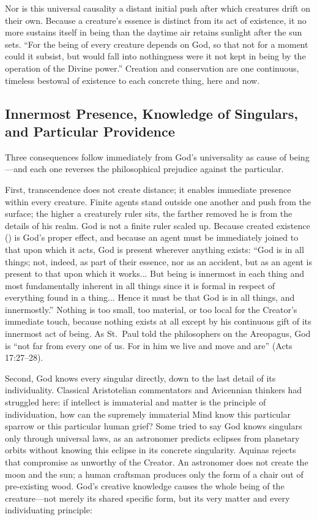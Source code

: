 Nor is this universal causality a distant initial push after which creatures drift on their own. Because a creature's essence is distinct from its act of existence, it no more sustains itself in being than the daytime air retains sunlight after the sun sets. ``For the being of every creature depends on God, so that not for a moment could it subsist, but would fall into nothingness were it not kept in being by the operation of the Divine power.'' Creation and conservation are one continuous, timeless bestowal of existence to each concrete thing, here and now.

\subsection{Innermost Presence, Knowledge of Singulars, and Particular Providence}

Three consequences follow immediately from God's universality as cause of being---and each one reverses the philosophical prejudice against the particular.

First, transcendence does not create distance; it enables immediate presence within every creature. Finite agents stand outside one another and push from the surface; the higher a creaturely ruler sits, the farther removed he is from the details of his realm. God is not a finite ruler scaled up. Because created existence () is God's proper effect, and because an agent must be immediately joined to that upon which it acts, God is present wherever anything exists: ``God is in all things; not, indeed, as part of their essence, nor as an accident, but as an agent is present to that upon which it works... But being is innermost in each thing and most fundamentally inherent in all things since it is formal in respect of everything found in a thing... Hence it must be that God is in all things, and innermostly.'' Nothing is too small, too material, or too local for the Creator's immediate touch, because nothing exists at all except by his continuous gift of its innermost act of being. As St.\ Paul told the philosophers on the Areopagus, God is ``not far from every one of us. For in him we live and move and are'' (Acts 17:27--28).

Second, God knows every singular directly, down to the last detail of its individuality. Classical Aristotelian commentators and Avicennian thinkers had struggled here: if intellect is immaterial and matter is the principle of individuation, how can the supremely immaterial Mind know this particular sparrow or this particular human grief? Some tried to say God knows singulars only through universal laws, as an astronomer predicts eclipses from planetary orbits without knowing this eclipse in its concrete singularity. Aquinas rejects that compromise as unworthy of the Creator. An astronomer does not create the moon and the sun; a human craftsman produces only the form of a chair out of pre-existing wood. God's creative knowledge causes the whole being of the creature---not merely its shared specific form, but its very matter and every individuating principle:


